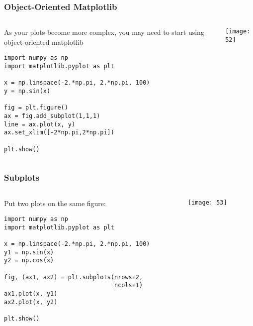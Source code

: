 \begin{frame}[fragile]\frametitle{Object-Oriented Matplotlib}

\begin{columns}
    \begin{column}[T]{0.6\linewidth}
    As your plots become more complex, you may need to start using object-oriented matplotlib
    \begin{lstlisting}
import numpy as np
import matplotlib.pyplot as plt

x = np.linspace(-2.*np.pi, 2.*np.pi, 100)
y = np.sin(x)

fig = plt.figure()
ax = fig.add_subplot(1,1,1)
line = ax.plot(x, y)
ax.set_xlim([-2*np.pi,2*np.pi])

plt.show()
    \end{lstlisting}

    \end{column}
    \begin{column}[T]{0.4\linewidth}
\begin{center}
\texttt{[image: 52]}
\end{center}
    \end{column}
  \end{columns}
  


\end{frame}

\begin{frame}[fragile]\frametitle{Subplots}

\begin{columns}
    \begin{column}[T]{0.6\linewidth}
    Put two plots on the same figure:
    \begin{lstlisting}
import numpy as np
import matplotlib.pyplot as plt

x = np.linspace(-2.*np.pi, 2.*np.pi, 100)
y1 = np.sin(x)
y2 = np.cos(x)

fig, (ax1, ax2) = plt.subplots(nrows=2,
                               ncols=1)
ax1.plot(x, y1)
ax2.plot(x, y2)

plt.show()
    \end{lstlisting}

    \end{column}
    \begin{column}[T]{0.4\linewidth}
\begin{center}
\texttt{[image: 53]}
\end{center}
    \end{column}
  \end{columns}
  
  


\end{frame}

